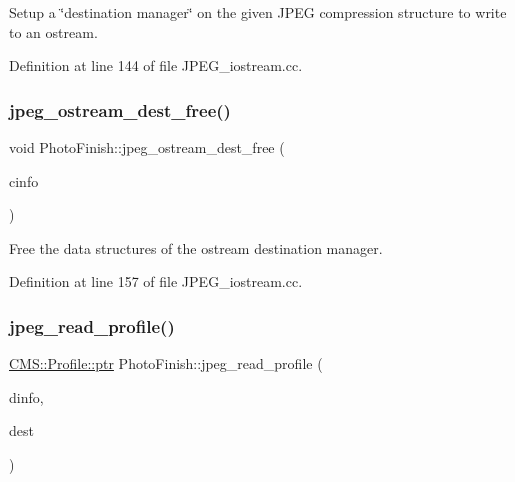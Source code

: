 Setup a \char`\"{}destination manager\char`\"{} on the given J\+P\+EG compression structure to write to an ostream. 



Definition at line 144 of file J\+P\+E\+G\+\_\+iostream.\+cc.

\mbox{\label{namespace_photo_finish_a83c709bef3546d9271d51694a7bdbbab}} 
\subsubsection{\texorpdfstring{jpeg\+\_\+ostream\+\_\+dest\+\_\+free()}{jpeg\_ostream\_dest\_free()}}
{\footnotesize\ttfamily void Photo\+Finish\+::jpeg\+\_\+ostream\+\_\+dest\+\_\+free (\begin{DoxyParamCaption}\item[{j\+\_\+compress\+\_\+ptr}]{cinfo }\end{DoxyParamCaption})}



Free the data structures of the ostream destination manager. 



Definition at line 157 of file J\+P\+E\+G\+\_\+iostream.\+cc.

\mbox{\label{namespace_photo_finish_a646def5a531d0c79b58c5a8ca485837b}} 
\subsubsection{\texorpdfstring{jpeg\+\_\+read\+\_\+profile()}{jpeg\_read\_profile()}}
{\footnotesize\ttfamily \hyperlink{class_c_m_s_1_1_profile_a7d5a80e1317d17dbfdf5ae69820ab08b}{C\+M\+S\+::\+Profile\+::ptr} Photo\+Finish\+::jpeg\+\_\+read\+\_\+profile (\begin{DoxyParamCaption}\item[{jpeg\+\_\+decompress\+\_\+struct $\ast$}]{dinfo,  }\item[{\hyperlink{class_photo_finish_1_1_destination_a0d282a905cd81c3f0e6d7233c9bc7774}{Destination\+::ptr}}]{dest }\end{DoxyParamCaption})}



